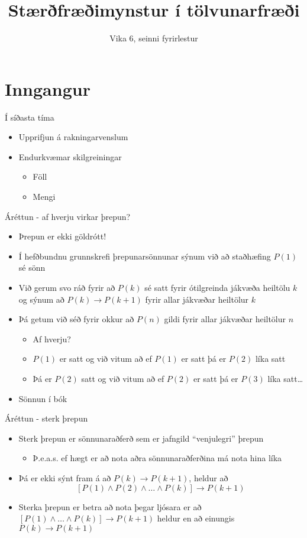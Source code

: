 \documentclass{beamer}
\title{Stærðfræðimynstur í tölvunarfræði}
\subtitle{Vika 6, seinni fyrirlestur}
\begin{document}
\begin{frame}
\titlepage
\end{frame}


\section{Inngangur}

\begin{frame}{Í síðasta tíma}
\begin{itemize}
 \item Upprifjun á rakningarvenslum
 \item Endurkvæmar skilgreiningar
 \begin{itemize}
  \item Föll
  \item Mengi
 \end{itemize}
\end{itemize}
\end{frame}

\begin{frame}{Áréttun - af hverju virkar þrepun?}
\begin{itemize}
 \item Þrepun er ekki göldrótt!
 \item Í hefðbundnu grunnskrefi þrepunarsönnunar sýnum við að staðhæfing $P(1)$ sé sönn
 \item Við gerum svo ráð fyrir að $P(k)$ sé satt fyrir ótilgreinda jákvæða heiltölu $k$ og sýnum að $P(k) \to P(k+1)$ fyrir allar jákvæðar heiltölur $k$
 \item Þá getum við séð fyrir okkur að $P(n)$ gildi fyrir allar jákvæðar heiltölur $n$
 \begin{itemize}
  \item Af hverju?
  \item $P(1)$ er satt og við vitum að ef $P(1)$ er satt þá er $P(2)$ líka satt
  \item Þá er $P(2)$ satt og við vitum að ef $P(2)$ er satt þá er $P(3)$ líka satt\ldots
 \end{itemize}
 \item Sönnun í bók
\end{itemize}
\end{frame}

\begin{frame}{Áréttun - sterk þrepun}
\begin{itemize}
 \item Sterk þrepun er sönnunaraðferð sem er jafngild ``venjulegri'' þrepun
 \begin{itemize}
  \item Þ.e.a.s. ef hægt er að nota aðra sönnunaraðferðina má nota hina líka
 \end{itemize}
 \item Þá er ekki sýnt fram á að $P(k) \to P(k+1)$, heldur að \[[P(1) \land P(2) \land \ldots \land P(k)] \to P(k+1)\]
 \item Sterka þrepun er betra að nota þegar ljósara er að $[P(1) \land \ldots \land P(k)] \to P(k+1)$ heldur en að einungis $P(k) \to P(k+1)$
\end{itemize}
\end{frame}
\end{document}
